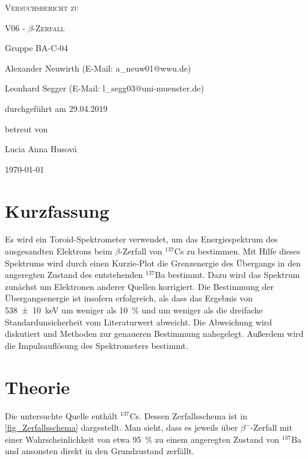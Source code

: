 \documentclass[
	a4paper,
	12pt,
	pagesize,
	ngerman
]{scrartcl}
\begin{document}
	\begin{titlepage}
		\centering
		{\scshape\LARGE Versuchsbericht zu \par}
		\vspace{1cm}
		{\scshape\huge V06 - $\beta$-Zerfall \par}
		\vspace{2.5cm}
		{\LARGE Gruppe BA-C-04 \par}
		\vspace{0.5cm}

		{\large Alexander Neuwirth (E-Mail: a\_neuw01@wwu.de) \par}
		{\large Leonhard Segger (E-Mail: l\_segg03@uni-muenster.de) \par}
		\vfill

		durchgeführt am 29.04.2019\par
		betreut von\par
		{\large Lucia Anna Husová}

		\vfill

		{\large \today\par}
	\end{titlepage}
	\tableofcontents
	\newpage


	\section{Kurzfassung}
	Es wird ein Toroid-Spektrometer verwendet, um das Energiespektrum des ausgesandten Elektrons beim $\beta$-Zerfall von $^{137}$Cs zu bestimmen.
	Mit Hilfe dieses Spektrums wird durch einen Kurzie-Plot die Grenzenergie des Übergangs in den angeregten Zustand des entstehenden $^{137}$Ba bestimmt.
	Dazu wird das Spektrum zunächst um Elektronen anderer Quellen korrigiert.
	Die Bestimmung der Übergangsenergie ist insofern erfolgreich, als dass das Ergebnis von \SI{538 \pm 10}{keV} um weniger als \SI{10}{\percent} und um weniger als die dreifache Standardunsicherheit vom Literaturwert abweicht.
	Die Abweichung wird diskutiert und Methoden zur genaueren Bestimmung nahegelegt.
	Außerdem wird  die Impulsauflösung des Spektrometers bestimmt.

  \section{Theorie}
	Die untersuchte Quelle enthält $^{137}$Cs.
	Dessen Zerfallsschema ist in \cref{fig_Zerfallsschema} dargestellt.
	Man sieht, dass es jeweils über $\beta^-$-Zerfall mit einer Wahrscheinlichkeit von etwa \SI{95}{\percent} zu einem angeregten Zustand von $^{137}$Ba und ansonsten direkt in den Grundzustand zerfällt.
\end{document}
